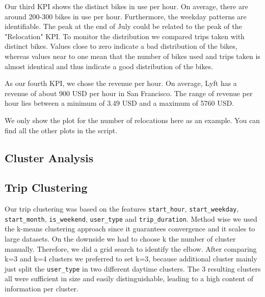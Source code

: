 Our third KPI shows the distinct bikes in use per hour. On average, there are around 200-300 bikes in use per hour. Furthermore, the weekday patterns are identifiable. The peak at the end of July could be related to the peak of the "Relocation" KPI. To monitor the distribution we compared trips taken with distinct bikes. Values close to zero indicate a bad distribution of the bikes, whereas values near to one mean that the number of bikes used and trips taken is almost identical and thus indicate a good distribution of the bikes.

As our fourth KPI, we chose the revenue per hour. On average, Lyft has a revenue of about 900 USD per hour in San Francisco. The range of revenue per hour lies between a minimum of 3.49 USD and a maximum of 5760 USD. 

We only show the plot for the number of relocations here as an example. You can find all the other plots in the script.
\subsection{Cluster Analysis}

\subsection{Trip Clustering} 
Our trip clustering was based on the features \texttt{start\_hour}, \texttt{start\_weekday}, \texttt{start\_month}, \texttt{is\_weekend}, \texttt{user\_type} and  \texttt{trip\_duration}. Method wise we used the k-means clustering approach since it guarantees convergence and it 
scales to large datasets. On the downside we had to choose k the number of cluster manually. Therefore, we did a grid search to identify the elbow. After comparing k=3 and k=4 clusters we preferred to set k=3, because additional cluster mainly just split the \texttt{user\_type} in two different daytime clusters. The 3 resulting clusters all were sufficient in size and easily distinguishable, leading to a high content of information per cluster.


